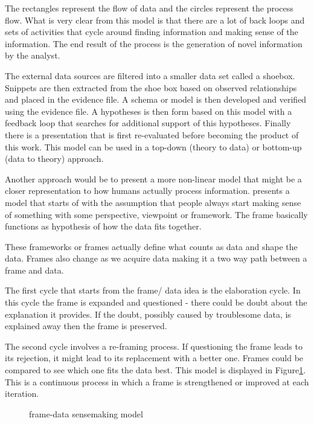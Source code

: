 The rectangles represent the flow of data and the circles represent the process flow. What is very clear from this model is that there are a lot of back loops and sets of activities that cycle around finding information and making sense of the information. The end result of the process is the generation of novel information by the analyst.

The external data sources are filtered into a smaller data set called a shoebox. Snippets are then extracted from the shoe box based on observed relationships and placed in the evidence file. A schema or model is then developed and verified using the evidence file. A hypotheses is then form based on this model with a feedback loop that searches for additional support of this hypotheses. Finally there is a presentation that is first re-evaluated before becoming the product of this work. This model can be used in a top-down (theory to data)  or bottom-up (data to theory) approach.

Another approach would be to present a more non-linear model that might be a closer representation to how humans actually process information. \cite{klein2006making} presents a model that starts of with the assumption that people always start making sense of something with some perspective, viewpoint or framework. The frame basically functions as hypothesis of how the data fits together.

These frameworks or frames actually define what counts as data and shape the data. Frames also change as we acquire data making it a two way path between a frame and data.

The first cycle that starts from the frame/ data idea is the elaboration cycle. In this cycle the frame is expanded and questioned - there could be doubt about the explanation it provides. If the doubt, possibly caused by troublesome data, is explained away then the frame is preserved.

The second cycle involves a re-framing process. If questioning the frame leads to its rejection, it might lead to its replacement with a better one. Frames could be compared to see which one fits the data best. This model is displayed in Figure\ref{fig:4}. This is a continuous process in which a frame is strengthened or improved at each iteration.


\begin{figure}[!ht]
	\centering{}
	\caption{\cite{klein2006making} frame-data sensemaking model}\label{fig:4}
\end{figure}

